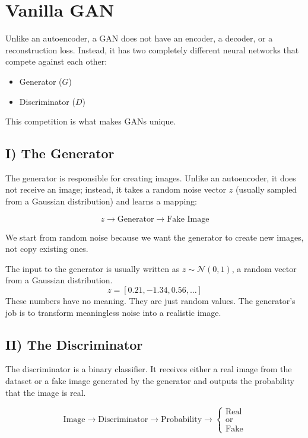 \section{Vanilla GAN}

Unlike an autoencoder, a GAN does not have an encoder, a decoder, or a reconstruction loss. Instead, it has two completely different neural networks that compete against each other:
\begin{itemize}
    \item Generator ($G$)
    \item Discriminator ($D$)
\end{itemize}

This competition is what makes GANs unique.

\subsection*{I) The Generator}

The generator is responsible for creating images. Unlike an autoencoder, it does not receive an image; instead, it takes a random noise vector $z$ (usually sampled from a Gaussian distribution) and learns a mapping:

\[
z \longrightarrow \text{Generator} \longrightarrow \text{Fake Image}
\]

We start from random noise because we want the generator to create new images, not copy existing ones.

The input to the generator is usually written as $z \sim \mathcal{N}(0, 1)$, a random vector from a Gaussian distribution.
\[
z = [0.21, -1.34, 0.56, \dots]
\]
These numbers have no meaning. They are just random values. The generator's job is to transform meaningless noise into a realistic image.

\subsection*{II) The Discriminator}

The discriminator is a binary classifier. It receives either a real image from the dataset or a fake image generated by the generator and outputs the probability that the image is real.

\[
\text{Image} \longrightarrow \text{Discriminator} \longrightarrow \text{Probability} \longrightarrow \begin{cases} \text{Real} \\ \text{or} \\ \text{Fake} \end{cases}
\]

